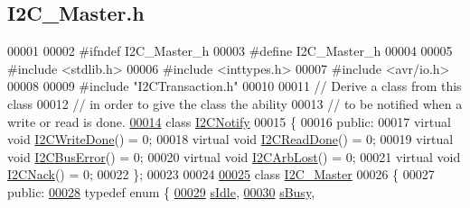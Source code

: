 \hypertarget{_i2_c___master_8h_source}{
\subsection{I2C\_\-Master.h}
}

\begin{DoxyCode}
00001 
00002 \textcolor{preprocessor}{#ifndef I2C\_Master\_h}
00003 \textcolor{preprocessor}{}\textcolor{preprocessor}{#define I2C\_Master\_h}
00004 \textcolor{preprocessor}{}
00005 \textcolor{preprocessor}{#include <stdlib.h>}
00006 \textcolor{preprocessor}{#include <inttypes.h>}
00007 \textcolor{preprocessor}{#include <avr/io.h>}
00008 
00009 \textcolor{preprocessor}{#include "I2CTransaction.h"}
00010 
00011 \textcolor{comment}{// Derive a class from this class}
00012 \textcolor{comment}{// in order to give the class the ability}
00013 \textcolor{comment}{// to be notified when a write or read is done.}
\hypertarget{_i2_c___master_8h_source_l00014}{}\hyperlink{class_i2_c_notify}{00014} \textcolor{keyword}{class }\hyperlink{class_i2_c_notify}{I2CNotify}
00015 \{
00016 \textcolor{keyword}{public}:
00017     \textcolor{keyword}{virtual} \textcolor{keywordtype}{void} \hyperlink{class_i2_c_notify_a1197403992ce3c5702944e846ec509db}{I2CWriteDone}() = 0;
00018     \textcolor{keyword}{virtual} \textcolor{keywordtype}{void} \hyperlink{class_i2_c_notify_a858816dd9007308942e62f5caa632e33}{I2CReadDone}() = 0;
00019     \textcolor{keyword}{virtual} \textcolor{keywordtype}{void} \hyperlink{class_i2_c_notify_a9b22fe2233f79a3e842145a6f1e4cc21}{I2CBusError}() = 0;
00020     \textcolor{keyword}{virtual} \textcolor{keywordtype}{void} \hyperlink{class_i2_c_notify_aa29e09f63a6191253d6c7203b3edf7d2}{I2CArbLost}() = 0;
00021     \textcolor{keyword}{virtual} \textcolor{keywordtype}{void} \hyperlink{class_i2_c_notify_a8257aa3b48d0ae23dac613c0cf2b6fb4}{I2CNack}() = 0;
00022 \};
00023 
00024 
\hypertarget{_i2_c___master_8h_source_l00025}{}\hyperlink{class_i2_c___master}{00025} \textcolor{keyword}{class }\hyperlink{class_i2_c___master}{I2C_Master}
00026 \{
00027 \textcolor{keyword}{public}:
\hypertarget{_i2_c___master_8h_source_l00028}{}\hyperlink{class_i2_c___master_aaa6720f57770cfe755cb3d6dfc665cfa}{00028}     \textcolor{keyword}{typedef} \textcolor{keyword}{enum} \{
\hypertarget{_i2_c___master_8h_source_l00029}{}\hyperlink{class_i2_c___master_aaa6720f57770cfe755cb3d6dfc665cfaa106aa4b7a5940d89eb0414d4419b7252}{00029}         \hyperlink{class_i2_c___master_aaa6720f57770cfe755cb3d6dfc665cfaa106aa4b7a5940d89eb0414d4419b7252}{sIdle},
\hypertarget{_i2_c___master_8h_source_l00030}{}\hyperlink{class_i2_c___master_aaa6720f57770cfe755cb3d6dfc665cfaab58465e81001fa18fb18c0d575767f7e}{00030}         \hyperlink{class_i2_c___master_aaa6720f57770cfe755cb3d6dfc665cfaab58465e81001fa18fb18c0d575767f7e}{sBusy},

\end{DoxyCode}
